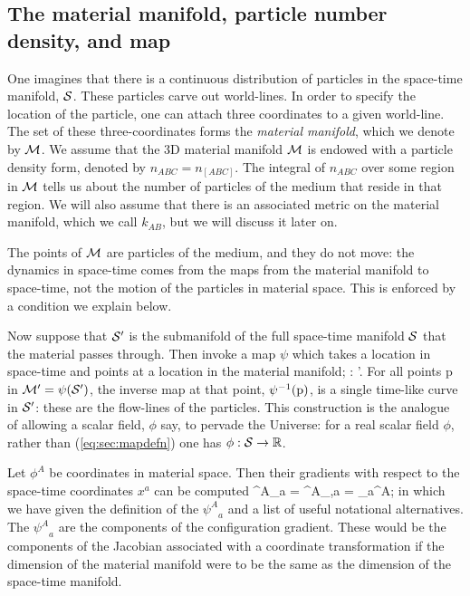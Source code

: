 \subsection{The material manifold,  particle number density, and map}
\label{sec:mpnd}
One imagines that there is a continuous distribution of particles in the space-time manifold, $\mathcal{S}$. These particles carve out world-lines. In order to specify the location of the particle, one can attach three coordinates to a given world-line. The set of these three-coordinates forms the \textit{material manifold}, which we denote by $\mathcal{M}$. We  assume that the 3D material manifold $\mathcal{M}$   is endowed with a particle density form, denoted by $n_{ABC} = n_{[ABC]}$.  The integral of $n_{ABC}$ over some region in $\mathcal{M}$ tells us about the number of particles of the medium that reside in that region. We will also assume that there is an associated metric on the material manifold, which we call $k_{AB}$, but we will discuss it   later on. 

The points of $\mathcal{M}$ are  particles of the medium, and they do not move: the dynamics in space-time comes from the maps from the material manifold to space-time, not the motion of the particles in material space.  This is enforced by a condition we explain below. 

 Now suppose that  $\mathcal{S}'$ is the submanifold of the full space-time manifold $\mathcal{S}$ that the material passes through. Then invoke a map $\psi$ which takes a location in space-time and points at a location in the material manifold;
\bea
\label{eq:sec:mapdefn}
\psi : \stmanif'\longrightarrow \matmanif.
\eea
For all points p in $\mathcal{M}' = \psi(\mathcal{S}')$, the inverse map at that point, $\psi^{-1}({\rm p})$, is a single time-like curve in $\mathcal{S}'$: these are the flow-lines of the particles. This construction is the analogue of allowing a scalar field, $\phi$ say, to pervade the Universe: for a real scalar field $\phi$, rather than (\ref{eq:sec:mapdefn}) one has $\phi : \mathcal{S}\rightarrow \mathbb{R}$.

Let $\phi^A$ be   coordinates in material space. Then their gradients with respect to the space-time coordinates $x^a$ can be computed
\bea
\label{eq:sec:config_gradient}
{\psi^A}_a  {} = {\phi^A}_{,a} = \partial_a\phi^A;
\eea
in which we have given the definition of the ${\psi^A}_a$ and a list of useful notational alternatives.
The ${\psi^A}_a$ are   the components of the configuration gradient. These would be the components of the Jacobian associated with a coordinate transformation if the dimension of the material manifold were to be the same as the dimension of the space-time manifold. 

